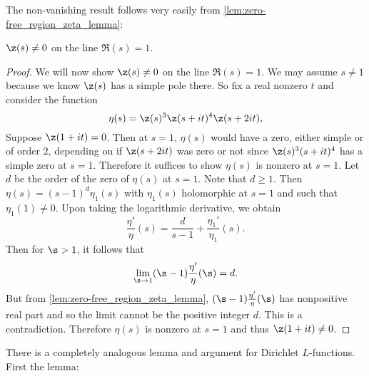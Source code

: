       The non-vanishing result follows very easily from \cref{lem:zero-free_region_zeta_lemma}:

      \begin{theorem}\label{thm:non-vanishing_of_zeta_on_Re(s)=1}
        $\z(s) \neq 0$ on the line $\Re(s) = 1$.
      \end{theorem}
      \begin{proof}
        We will now show $\z(s) \neq 0$ on the line $\Re(s) = 1$. We may assume $s \neq 1$ because we know $\z(s)$ has a simple pole there. So fix a real nonzero $t$ and consider the function
        \[
          \eta(s) = \z(s)^{3}\z(s+it)^{4}\z(s+2it),
        \]
        Suppose $\z(1+it) = 0$. Then at $s = 1$, $\eta(s)$ would have a zero, either simple or of order $2$, depending on if $\z(s+2it)$ was zero or not since $\z(s)^{3}(s+it)^{4}$ has a simple zero at $s = 1$. Therefore it suffices to show $\eta(s)$ is nonzero at $s = 1$. Let $d$ be the order of the zero of $\eta(s)$ at $s = 1$. Note that $d \ge 1$. Then $\eta(s) = (s-1)^{d}\eta_{1}(s)$ with $\eta_{1}(s)$ holomorphic at $s = 1$ and such that $\eta_{1}(1) \neq 0$. Upon taking the logarithmic derivative, we obtain
        \[
          \frac{\eta'}{\eta}(s) = \frac{d}{s-1}+\frac{\eta_{1}'}{\eta_{1}}(s).
        \]
        Then for $\s > 1$, it follows that
        \[
          \lim_{\s \to 1}(\s-1)\frac{\eta'}{\eta}(\s) = d.
        \]
        But from \cref{lem:zero-free_region_zeta_lemma}, $(\s-1)\frac{\eta'}{\eta}(\s)$ has nonpositive real part and so the limit cannot be the positive integer $d$. This is a contradiction. Therefore $\eta(s)$ is nonzero at $s = 1$ and thus $\z(1+it) \neq 0$.
      \end{proof}

      There is a completely analogous lemma and argument for Dirichlet $L$-functions. First the lemma:

